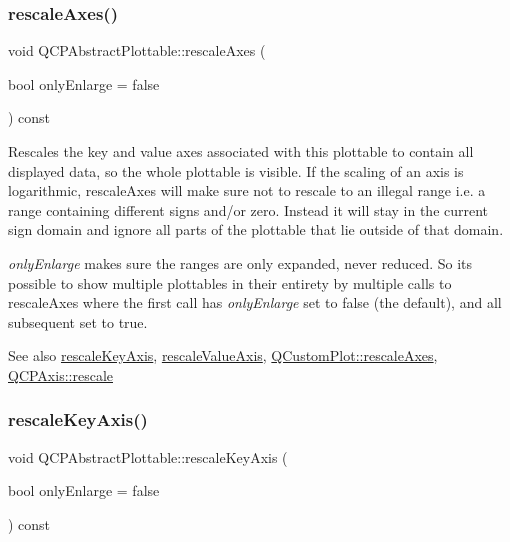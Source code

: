 \subsubsection{\texorpdfstring{rescaleAxes()}{rescaleAxes()}}
{\footnotesize\ttfamily void Q\+C\+P\+Abstract\+Plottable\+::rescale\+Axes (\begin{DoxyParamCaption}\item[{bool}]{only\+Enlarge = {\ttfamily false} }\end{DoxyParamCaption}) const}

Rescales the key and value axes associated with this plottable to contain all displayed data, so the whole plottable is visible. If the scaling of an axis is logarithmic, rescale\+Axes will make sure not to rescale to an illegal range i.\+e. a range containing different signs and/or zero. Instead it will stay in the current sign domain and ignore all parts of the plottable that lie outside of that domain.

{\itshape only\+Enlarge} makes sure the ranges are only expanded, never reduced. So it\textquotesingle{}s possible to show multiple plottables in their entirety by multiple calls to rescale\+Axes where the first call has {\itshape only\+Enlarge} set to false (the default), and all subsequent set to true.

\begin{DoxySeeAlso}{See also}
\mbox{\hyperlink{class_q_c_p_abstract_plottable_ae96b83c961e257da116c6acf9c7da308}{rescale\+Key\+Axis}}, \mbox{\hyperlink{class_q_c_p_abstract_plottable_a714eaf36b12434cd71846215504db82e}{rescale\+Value\+Axis}}, \mbox{\hyperlink{class_q_custom_plot_ad86528f2cee6c7e446dea4a6e8839935}{Q\+Custom\+Plot\+::rescale\+Axes}}, \mbox{\hyperlink{class_q_c_p_axis_a499345f02ebce4b23d8ccec96e58daa9}{Q\+C\+P\+Axis\+::rescale}} 
\end{DoxySeeAlso}
\mbox{\label{class_q_c_p_abstract_plottable_ae96b83c961e257da116c6acf9c7da308}} 
\subsubsection{\texorpdfstring{rescaleKeyAxis()}{rescaleKeyAxis()}}
{\footnotesize\ttfamily void Q\+C\+P\+Abstract\+Plottable\+::rescale\+Key\+Axis (\begin{DoxyParamCaption}\item[{bool}]{only\+Enlarge = {\ttfamily false} }\end{DoxyParamCaption}) const}

